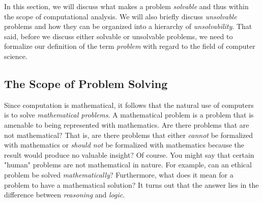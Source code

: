 In this section, we will discuss what makes a problem \textit{solvable} and thus within the scope of computational analysis. We will also briefly discuss \textit{unsolvable} problems and how they can be organized into a hierarchy of \textit{unsolvability}. That said, before we discuss either solvable or unsolvable problems, we need to formalize our definition of the term \textit{problem} with regard to the field of computer science. \\


\subsection{The Scope of Problem Solving}




Since computation is mathematical, it follows that the natural use of computers is to solve \textit{mathematical problems}. A mathematical problem is a problem that is amenable to being represented with mathematics. Are there problems that are not mathematical? That is, are there problems that either \textit{cannot} be formalized with mathematics or \textit{should not} be formalized with mathematics because the result would produce no valuable insight? Of course. You might say that certain "human" problems are not mathematical in nature. For example, can an ethical problem be solved \textit{mathematically}? Furthermore, what does it mean for a problem to have a mathematical solution? It turns out that the answer lies in the difference between \textit{reasoning} and \textit{logic}. \\



